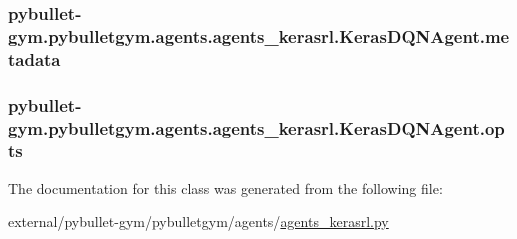 \subsubsection[{\texorpdfstring{metadata}{metadata}}]{\setlength{\rightskip}{0pt plus 5cm}pybullet-\/gym.\+pybulletgym.\+agents.\+agents\+\_\+kerasrl.\+Keras\+D\+Q\+N\+Agent.\+metadata}\hypertarget{classpybullet-gym_1_1pybulletgym_1_1agents_1_1agents__kerasrl_1_1_keras_d_q_n_agent_a9f36c2e4df2b91ec1f2a406b678c5d0e}{}\label{classpybullet-gym_1_1pybulletgym_1_1agents_1_1agents__kerasrl_1_1_keras_d_q_n_agent_a9f36c2e4df2b91ec1f2a406b678c5d0e}
\subsubsection[{\texorpdfstring{opts}{opts}}]{\setlength{\rightskip}{0pt plus 5cm}pybullet-\/gym.\+pybulletgym.\+agents.\+agents\+\_\+kerasrl.\+Keras\+D\+Q\+N\+Agent.\+opts}\hypertarget{classpybullet-gym_1_1pybulletgym_1_1agents_1_1agents__kerasrl_1_1_keras_d_q_n_agent_a932cc8ca2a27589dac0e653a2be93475}{}\label{classpybullet-gym_1_1pybulletgym_1_1agents_1_1agents__kerasrl_1_1_keras_d_q_n_agent_a932cc8ca2a27589dac0e653a2be93475}


The documentation for this class was generated from the following file\+:\begin{DoxyCompactItemize}
\item 
external/pybullet-\/gym/pybulletgym/agents/\hyperlink{agents__kerasrl_8py}{agents\+\_\+kerasrl.\+py}\end{DoxyCompactItemize}
